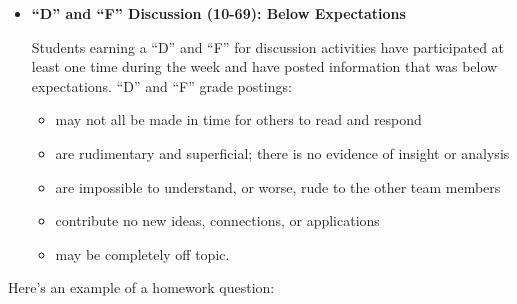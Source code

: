 \documentclass[12pt]{article}
\begin{document}
\begin{itemize}
\begin{itemize}
    \end{itemize}
  \item \textbf{``D'' and ``F'' Discussion (10-69): Below Expectations}

    Students earning a ``D'' and ``F'' for discussion activities have
    participated at least one time during the week and have posted
    information that was below expectations. ``D'' and ``F'' grade postings:
    \begin{itemize}
    \item  may not all be made in time for others to read and respond
    \item are rudimentary and superficial; there is no evidence of
      insight or analysis
    \item  are impossible to understand, or worse, rude to the other team members
    \item  contribute no new ideas, connections, or applications
    \item  may be completely off topic.

    \end{itemize}


  \end{itemize}
    Here's an example of a homework question:
\end{document}

